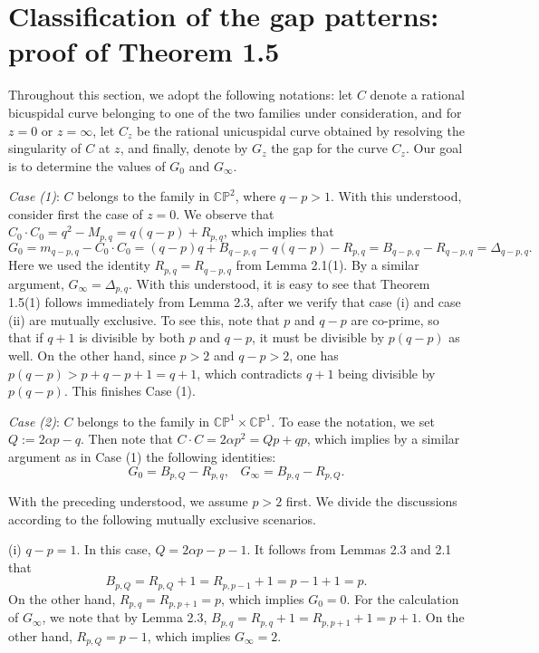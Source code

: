 \documentclass[11pt]{amsart}
\theoremstyle{plain}
\numberwithin{theorem}{section}
\theoremstyle{definition}
\newcommand{\C}{{\mathbb C}}
\renewcommand{\P}{{\mathbb P}}
\begin{document}

\section{Classification of the gap patterns: proof of Theorem 1.5}

Throughout this section, we adopt the following notations: let $C$ denote a rational bicuspidal curve belonging to one of the two families under consideration, and for $z=0$ or $z=\infty$, let $C_z$ be the rational unicuspidal curve obtained by resolving the singularity of $C$ at $z$, and finally, denote by $G_z$ the gap for the curve $C_z$. Our goal is to determine the values of $G_0$ and $G_\infty$. 

\vspace{2mm}

{\it Case (1)}: $C$ belongs to the family in $\C\P^2$, where $q-p>1$. With this understood, consider first the case of $z=0$. We observe that 
$C_0\cdot C_0=q^2-M_{p,q}=q(q-p)+ R_{p,q}$, which implies that
$$
G_0=m_{q-p,q}-C_0\cdot C_0=(q-p)q+B_{q-p,q}-q(q-p)-R_{p,q}=B_{q-p,q}-R_{q-p,q}=\Delta_{q-p,q}.
$$
Here we used the identity $R_{p,q}=R_{q-p,q}$ from Lemma 2.1(1). By a similar argument, $G_\infty=\Delta_{p,q}$. With this understood, it is easy to see that 
Theorem 1.5(1) follows immediately from Lemma 2.3, after we verify that case (i) and case (ii) are mutually exclusive.
To see this, note that $p$ and $q-p$ are co-prime, so that if $q+1$ is divisible by both $p$ and $q-p$,
it must be divisible by $p(q-p)$ as well. On the other hand, since $p>2$ and $q-p>2$, one has 
$p(q-p)> p+q-p+1=q+1$, which contradicts $q+1$ being divisible by $p(q-p)$. This finishes Case (1).

\vspace{2mm}

{\it Case (2)}: $C$ belongs to the family in $\C\P^1\times \C\P^1$. To ease the notation, we set
$Q:=2\alpha p-q$. Then note that $C\cdot C=2\alpha p^2=Qp+ qp$, which implies by a similar argument as in Case (1) the following identities:
$$
G_0=B_{p,Q}-R_{p,q}, \;\;\; G_\infty =B_{p,q}-R_{p,Q}. 
$$

With the preceding understood, we assume $p>2$ first. We divide the discussions according to the following mutually exclusive scenarios.

(i) $q-p=1$. In this case, $Q=2\alpha p-p-1$. It follows from Lemmas 2.3 and 2.1 that 
$$
B_{p,Q}=R_{p,Q}+1=R_{p,p-1}+1=p-1+1=p.
$$
On the other hand, $R_{p,q}=R_{p,p+1}=p$, which implies $G_0=0$. For the calculation of $G_\infty$, we note that by Lemma 2.3, $B_{p,q}=R_{p,q}+1=R_{p,p+1}+1=p+1$. On the other hand, 
$R_{p,Q}=p-1$, which implies $G_\infty=2$.
\end{document}
